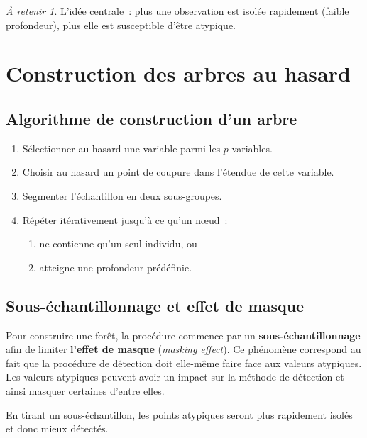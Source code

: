 \documentclass[a4paper,11pt]{article}
\theoremstyle{definition}
\theoremstyle{remark}
\newtheorem*{important}{\`A retenir}
\begin{document}
\begin{important}
  L'id\'ee centrale~: plus une observation est isol\'ee rapidement (faible
  profondeur), plus elle est susceptible d'\^etre atypique.
\end{important}

\section{Construction des arbres au hasard}

\subsection{Algorithme de construction d'un arbre}

\begin{enumerate}
  \item S\'electionner au hasard une variable parmi les $p$ variables.
  \item Choisir au hasard un point de coupure dans l'\'etendue de cette
    variable.
  \item Segmenter l'\'echantillon en deux sous-groupes.
  \item R\'ep\'eter it\'erativement jusqu'\`a ce qu'un n\oe ud~:
  \begin{enumerate}
    \item ne contienne qu'un seul individu, ou
    \item atteigne une profondeur pr\'ed\'efinie.
  \end{enumerate}
\end{enumerate}

\subsection{Sous-\'echantillonnage et effet de masque}

Pour construire une for\^et, la proc\'edure commence par un
\textbf{sous-\'echantillonnage} afin de limiter \textbf{l'effet de masque}
(\emph{masking effect}). Ce ph\'enom\`ene correspond au fait que la
proc\'edure de d\'etection doit elle-m\^eme faire face aux valeurs atypiques.
Les valeurs atypiques peuvent avoir un impact sur la m\'ethode de d\'etection
et ainsi masquer certaines d'entre elles.

En tirant un sous-\'echantillon, les points atypiques seront plus rapidement
isol\'es et donc mieux d\'etect\'es.
\end{document}
